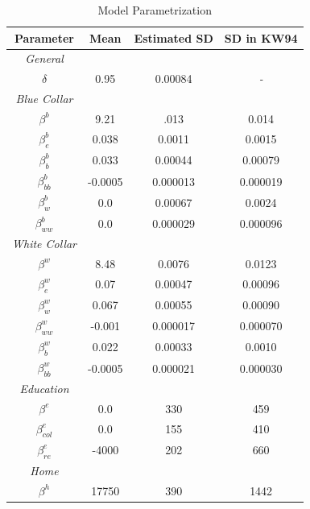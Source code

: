 \setlength{\tabcolsep}{18pt} %
\begin{table}[H] 
	\centering
	\begin{threeparttable}
		\caption[Model Parametrization]{Model Parametrization}
		\label{tab:params}
		\renewcommand{\arraystretch}{1.2}%
		\begin{tabular}{cS[table-format=3.2]S[table-format=3.2]S[table-format=3.2]}
			\toprule
			{Parameter}     & {Mean}   & {Estimated SD} & {SD in KW94} \\ \midrule
			\textit{General} \\
			$\delta$ & 0.95   & 0.00084 & \textit{-}	\\	\midrule
			\textit{Blue Collar}\\	
			$\beta^b$ & 9.21   & .013            & 0.014      \\
			$\beta_e^b$ & 0.038  &    0.0011        & 0.0015       \\
			$\beta^b_b$ & 0.033  & 0.00044            & 0.00079       \\
			$\beta^b_{bb}$ & -0.0005 & 0.000013           & 0.000019       \\
			$\beta^b_w$ & 0.0    & 0.00067             & 0.0024      \\
			$\beta^b_{ww}$ & 0.0    & 0.000029           & 0.000096       \\ \midrule
			\textit{White Collar}\\
			$\beta^w$ & 8.48   & 0.0076             & 0.0123      \\
			$\beta^w_e$ & 0.07   & 0.00047          & 0.00096       \\
			$\beta^w_w$ & 0.067  & 0.00055            & 0.00090      \\
			$\beta^w_{ww}$ & -0.001  & 0.000017           & 0.000070     \\
			$\beta^w_b$ & 0.022  & 0.00033           & 0.0010      \\
			$\beta^w_{bb}$ & -0.0005 & 0.000021         & 0.000030      \\ \midrule
			\textit{Education} \\
			$\beta^e$     & 0.0    & 330                & 459       \\
			$\beta_{col}^e$     & 0.0    & 155               & 410       \\
			$\beta_{re}^e$     & -4000   & 202                & 660       \\ \midrule
			\textit{Home} \\
			$\beta^h$    & 17750  & 390                & 1442      \\ \midrule

\end{tabular}
\end{threeparttable}
\end{table}
